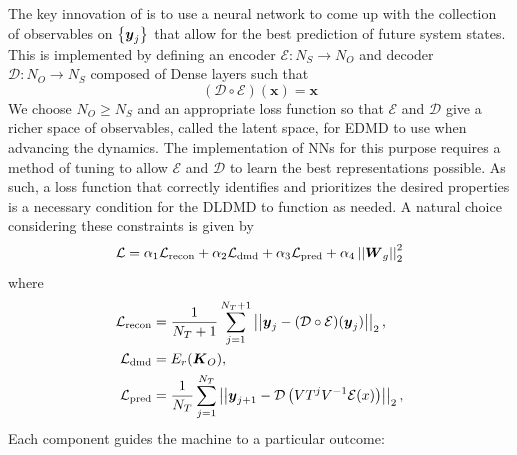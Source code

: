 The key innovation of 
\cite{lago} is to use a neural network to come up with the collection of 
observables on $\left\{\boldsymbol{y}_j\right\}$ that allow for the best prediction 
of future system states. This is implemented by defining an encoder 
$\mathcal{E}: N_S \to N_O$ and decoder $\mathcal{D}: N_O \to N_S$ composed of 
Dense layers such that 
$$(\mathcal{D}\circ\mathcal{E})(\boldsymbol{x}) = \boldsymbol{x}$$
We choose $N_O \geq N_S$ and an appropriate loss function so that 
$\mathcal{E}$ and $\mathcal{D}$ give a richer space of observables, called the 
latent space, for EDMD to use when advancing the dynamics. The implementation 
of NNs for this purpose requires a method of tuning to allow $\mathcal{E}$ and 
$\mathcal{D}$ to learn the best representations possible. As such, a loss 
function that correctly identifies and prioritizes the desired properties is 
a necessary condition for the DLDMD to function as needed. A natural choice
considering these constraints is given by
\begin{equation}
    \mathcal{L} = \alpha_1 \mathcal{L}_{\text{recon}} + \alpha_2 \mathcal{L}
    _{\text{dmd}} + \alpha_3 \mathcal{L}_{\text{pred}} +\alpha_4 
    \left|\left|\boldsymbol{W}_g\right|\right|_2^2 \label{eqn:loss function} 
\end{equation}
where 
\begin{align}
    \mathcal{L}_{\text{recon}} &= \frac{1}{N_T + 1}\sum_{j=1}^{N_T+1}\left|\left|\boldsymbol{y}_j - 
    (\mathcal{D}\circ\mathcal{E})(\boldsymbol{y}_j)\right|\right|_2, \\
    \mathcal{L}_{\text{dmd}} &= E_r(\boldsymbol{K}_O), \\
    \mathcal{L}_{\text{pred}} &= \frac{1}{N_T}\sum_{j=1}^{N_T}\left|\left|\boldsymbol{y}_{j+1} - 
    \mathcal{D}\left(VT^j V^{-1}\mathcal{E}(x)\right)\right|\right|_2, \label{eqn:blah}
\end{align}
Each component guides the machine to a particular outcome: 
